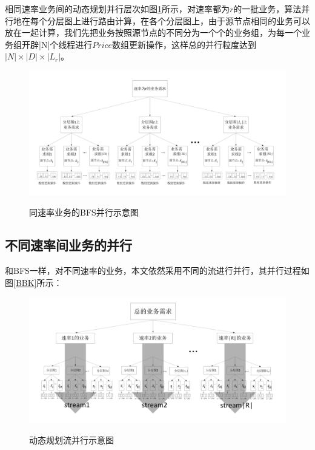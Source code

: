 相同速率业务间的动态规划并行层次如图\ref{DRK}所示，对速率都为$r$的一批业务，算法并行地在每个分层图上进行路由计算，在各个分层图上，由于源节点相同的业务可以放在一起计算，我们先把业务按照源节点的不同分为一个个的业务组，为每一个业务组开辟|N|个线程进行$Price$数组更新操作，这样总的并行粒度达到$|N|\times|D|\times|L_r|$。
\begin{figure}
\setlength{\belowcaptionskip}{-0.5cm}
\begin{center}
{\includegraphics[width=1 \textwidth]{figures/DRK.pdf}}
\end{center}
\caption{{\footnotesize{同速率业务的BFS并行示意图}}}
\label{DRK}
\end{figure}
\subsection{不同速率间业务的并行}
和BFS一样，对不同速率的业务，本文依然采用不同的流进行并行，其并行过程如图\ref{BBK}所示：
\begin{figure}
\setlength{\belowcaptionskip}{-0.5cm}
\begin{center}
{\includegraphics[width=1 \textwidth]{figures/BBK.pdf}}
\end{center}
\caption{{\footnotesize{动态规划流并行示意图}}}
\label{prof}
\end{figure}
